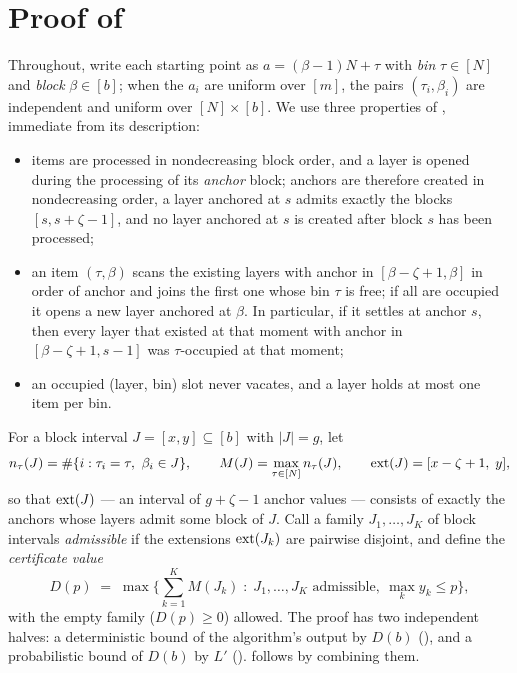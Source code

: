 
\section{Proof of }
\label{app:Lprime}

Throughout, write each starting point as $a = (\beta - 1)N + \tau$ with
\emph{bin} $\tau \in [N]$ and \emph{block} $\beta \in [b]$; when the $a_i$
are uniform over $[m]$, the pairs $(\tau_i, \beta_i)$ are independent and
uniform over $[N] \times [b]$. We use three properties of
, immediate from its description:

\begin{itemize}
  \item[(P1)] items are processed in nondecreasing block order, and a layer
        is opened during the processing of its \emph{anchor} block; anchors
        are therefore created in nondecreasing order, a layer anchored at
        $s$ admits exactly the blocks $[s, s+\zeta-1]$, and no layer
        anchored at $s$ is created after block $s$ has been processed;
  \item[(P2)] an item $(\tau, \beta)$ scans the existing layers with anchor
        in $[\beta-\zeta+1, \beta]$ in order of anchor and joins the first
        one whose bin $\tau$ is free; if all are occupied it opens a new
        layer anchored at $\beta$. In particular, if it settles at anchor
        $s$, then every layer that existed at that moment with anchor in
        $[\beta-\zeta+1, s-1]$ was $\tau$-occupied at that moment;
  \item[(P3)] an occupied (layer, bin) slot never vacates, and a layer holds
        at most one item per bin.
\end{itemize}

For a block interval $J = [x, y] \subseteq [b]$ with $|J| = g$, let
\[
  n_\tau(J) = \#\{ i : \tau_i = \tau,\ \beta_i \in J \},
  \qquad
  M(J) = \max_{\tau \in [N]} n_\tau(J),
  \qquad
  \ext(J) = [x - \zeta + 1,\; y],
\]
so that $\mathrm{ext}(J)$ --- an interval of $g+\zeta-1$ anchor values --- consists
of exactly the anchors whose layers admit some block of $J$. Call a family
$J_1, \dots, J_K$ of block intervals \emph{admissible} if the extensions
$\mathrm{ext}(J_k)$ are pairwise disjoint, and define the \emph{certificate value}
\[
  D(p) \;=\; \max\Big\{ \textstyle\sum_{k=1}^{K} M(J_k) \;:\;
     J_1, \dots, J_K \text{ admissible},\ \max_k y_k \le p \Big\},
\]
with the empty family ($D(p) \ge 0$) allowed. The proof has two independent
halves: a deterministic bound of the algorithm's output by $D(b)$
(), and a probabilistic bound of $D(b)$ by $L'$
().  follows by combining them.

